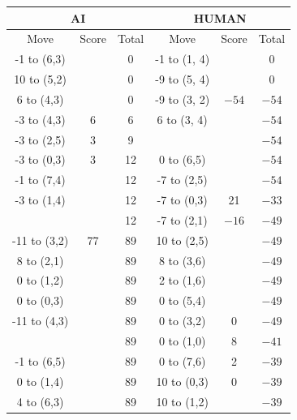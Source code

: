 \begin{appendices}
\begin{table}[H]
    \centering
    \begin{tabular}{cccccc}
        \hline
        \multicolumn{3}{c}{AI}        & \multicolumn{3}{c}{HUMAN}     \\ \hline
        Move         & Score & Total & Move          & Score & Total \\ \hline
          -1 to (6,3) &      &  0    &   -1 to (1, 4) &      &  0    \\ \hline
          10 to (5,2) &      &  0    &   -9 to (5, 4) &      &  0    \\ \hline
          6 to (4,3) &      &  0    &   -9 to (3, 2) &  $-54$    &  $-54$    \\ \hline
          -3 to (4,3) &  6    &  6    &   6 to (3, 4) &      &  $-54$    \\ \hline
          -3 to (2,5) &  3    &  9    &               &      &  $-54$    \\ \hline
          -3 to (0,3) &  3    &  12    &   0 to (6,5)        &      &  $-54$    \\ \hline
          -1 to (7,4) &      &  12    &   -7 to (2,5)        &      &  $-54$    \\ \hline
          -3 to (1,4) &      &  12    &   -7 to (0,3)        &  21 &  $-33$    \\ \hline
                      &      &  12    &   -7 to (2,1)        &  $-16$    &  $-49$    \\ \hline
          -11 to (3,2) &  77    &  89    &   10 to (2,5)        &      &  $-49$    \\ \hline
          8 to (2,1) &      &  89    &   8 to (3,6)        &      &  $-49$    \\ \hline
          0 to (1,2) &      &  89    &   2 to (1,6)        &      &  $-49$    \\ \hline
          0 to (0,3) &      &  89    &   0 to (5,4)        &      &  $-49$    \\ \hline
          -11 to (4,3) &      &  89    &   0 to (3,2)        &  $0$    &  $-49$    \\ \hline
                       &      &  89    &   0 to (1,0)        &  8    &  $-41$    \\ \hline
          -1 to (6,5) &      &  89    &   0 to (7,6)        &  2    &  $-39$    \\ \hline
          0 to (1,4) &      &  89    &   10 to (0,3)        &  0    &  $-39$    \\ \hline
          4 to (6,3) &      &  89    &   10 to (1,2)        &      &  $-39$    \\ \hline

\end{tabular}
\end{table}
\end{appendices}
